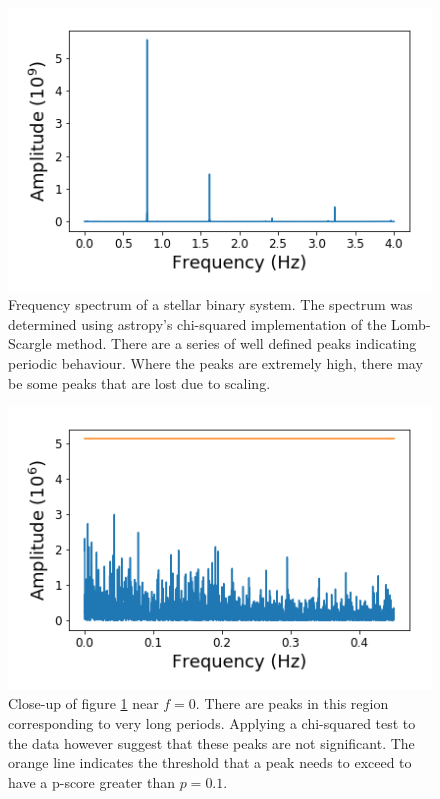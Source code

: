 \documentclass[twocolumn]{article}
\begin{document}
\begin{figure}
\centering
\includegraphics[width=\linewidth]{BinarySpectrum}
\caption{Frequency spectrum of a stellar binary system. The spectrum was determined using astropy's chi-squared implementation of the Lomb-Scargle method. There are a series of well defined peaks indicating periodic behaviour. Where the peaks are extremely high, there may be some peaks that are lost due to scaling.}
\label{fig:BinarySpectrum}
\end{figure}

\begin{figure}
\centering
\includegraphics[width=\linewidth]{binaryZoom}
\caption{Close-up of figure \ref{fig:BinarySpectrum} near $f=0$. There are peaks in this region corresponding to very long periods. Applying a chi-squared test to the data however suggest that these peaks are not significant. The orange line indicates the threshold that a peak needs to exceed to have a p-score greater than $p=0.1$.}
\label{fig:binaryZoom}
\end{figure}
\end{document}
